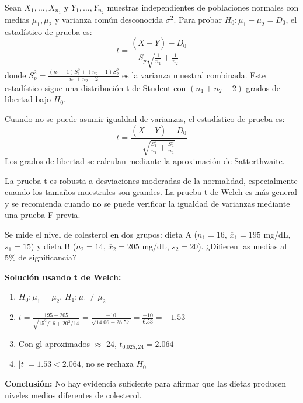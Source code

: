 \begin{theorem}
Sean $X_1, \ldots, X_{n_1}$ y $Y_1, \ldots, Y_{n_2}$ muestras independientes de poblaciones normales con medias $\mu_1, \mu_2$ y varianza común desconocida $\sigma^2$. Para probar $H_0: \mu_1 - \mu_2 = D_0$, el estadístico de prueba es:
\[
t = \frac{(\overline{X} - \overline{Y}) - D_0}{S_p\sqrt{\frac{1}{n_1} + \frac{1}{n_2}}}
\]
donde $S_p^2 = \frac{(n_1-1)S_1^2 + (n_2-1)S_2^2}{n_1 + n_2 - 2}$ es la varianza muestral combinada.
Este estadístico sigue una distribución t de Student con $(n_1 + n_2 - 2)$ grados de libertad bajo $H_0$.
\end{theorem}

\begin{theorem}
Cuando no se puede asumir igualdad de varianzas, el estadístico de prueba es:
\[
t = \frac{(\overline{X} - \overline{Y}) - D_0}{\sqrt{\frac{S_1^2}{n_1} + \frac{S_2^2}{n_2}}}
\]
Los grados de libertad se calculan mediante la aproximación de Satterthwaite.
\end{theorem}

\begin{remark}
La prueba t es robusta a desviaciones moderadas de la normalidad, especialmente cuando los tamaños muestrales son grandes. La prueba t de Welch es más general y se recomienda cuando no se puede verificar la igualdad de varianzas mediante una prueba F previa.
\end{remark}

\begin{example}
Se mide el nivel de colesterol en dos grupos: dieta A ($n_1=16$, $\overline{x}_1=195$ mg/dL, $s_1=15$) y dieta B ($n_2=14$, $\overline{x}_2=205$ mg/dL, $s_2=20$). ¿Difieren las medias al 5\% de significancia?

\textbf{Solución usando t de Welch:}
\begin{enumerate}
    \item $H_0: \mu_1 = \mu_2$, $H_1: \mu_1 \neq \mu_2$
    \item $t = \frac{195-205}{\sqrt{15^2/16 + 20^2/14}} = \frac{-10}{\sqrt{14.06 + 28.57}} = \frac{-10}{6.53} = -1.53$
    \item Con gl aproximados $\approx$ 24, $t_{0.025,24} = 2.064$
    \item $|t| = 1.53 < 2.064$, no se rechaza $H_0$
\end{enumerate}
\textbf{Conclusión:} No hay evidencia suficiente para afirmar que las dietas producen niveles medios diferentes de colesterol.
\end{example}

